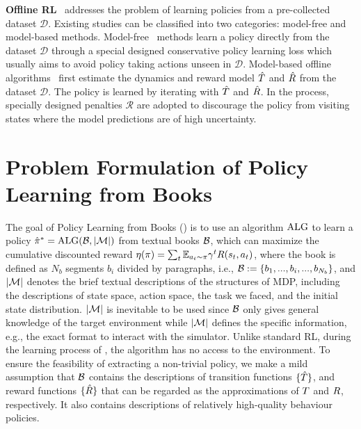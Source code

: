 \textbf{Offline RL}~\citep{levine2020offline} addresses the problem of learning policies from a pre-collected dataset $\mathcal{D}$. 
Existing studies can be classified into two categories: model-free and model-based methods. Model-free~\citep{cql@2020aviral, brac@2019yifan, td3-bc@2021fujimoto, bear@aviral2019, rem@2020rishabh, iql@2021kostrikov, dsconstraint@2023ran} methods learn a policy directly from the dataset $\mathcal{D}$ through a special designed conservative policy learning loss which usually aims to avoid policy taking actions unseen in $\mathcal{D}$. Model-based offline algorithms~\citep{mopo@2020tianhe, morel@2022rahul, maple@2023xionghui, mobile@sun2023, genoffline@luo2024,ruifeng@icml24,pcm,galileo} first estimate the dynamics and reward model $\hat {T}$ and $\hat {R}$ from the dataset $\mathcal{D}$. The policy is learned by iterating with $\hat {T}$ and $\hat {R}$. In the process, specially designed penalties $\mathcal{R}$ are adopted to discourage the policy from visiting states where the model predictions are of high uncertainty.


\vspace{-1mm}
\section{Problem Formulation of Policy Learning from Books}
\vspace{-2mm}


The goal of Policy Learning from Books ({\topic}) is to use an algorithm $\rm{ALG}$ to learn a policy $\hat \pi^*=\rm{ALG}(\mathcal{B}, |{\mathcal{M}}|)$ from textual books $\mathcal{B}$, which can maximize the cumulative discounted reward $\eta(\pi)=\sum_t\mathbb{E}_{a_t\sim \pi}\gamma^tR(s_t,a_t)$, where the book is defined as $N_b$ segments $b_i$ divided by paragraphs, i.e., $\mathcal{B}:=\{b_1, ..., b_i, ..., b_{N_b}\}$, and $|{\mathcal{M}}|$ denotes the brief textual descriptions of the structures of MDP, including the descriptions of state space, action space, the task we faced, and the initial state distribution. $|{\mathcal{M}}|$  is inevitable to be used since $\mathcal{B}$ only gives general knowledge of the target environment while $|{\mathcal{M}}|$ defines the specific information, e.g., the exact format to interact with the simulator.
Unlike standard RL, during the learning process of {\topic}, the algorithm has no access to the environment. To ensure the feasibility of extracting a non-trivial policy, we make a mild assumption that $\mathcal{B}$ contains the descriptions of transition functions $\{\hat {T}\}$, and reward functions $\{\hat {R}\}$ that can be regarded as the approximations of $T$ and $R$, respectively. It also contains descriptions of relatively high-quality behaviour policies. 



